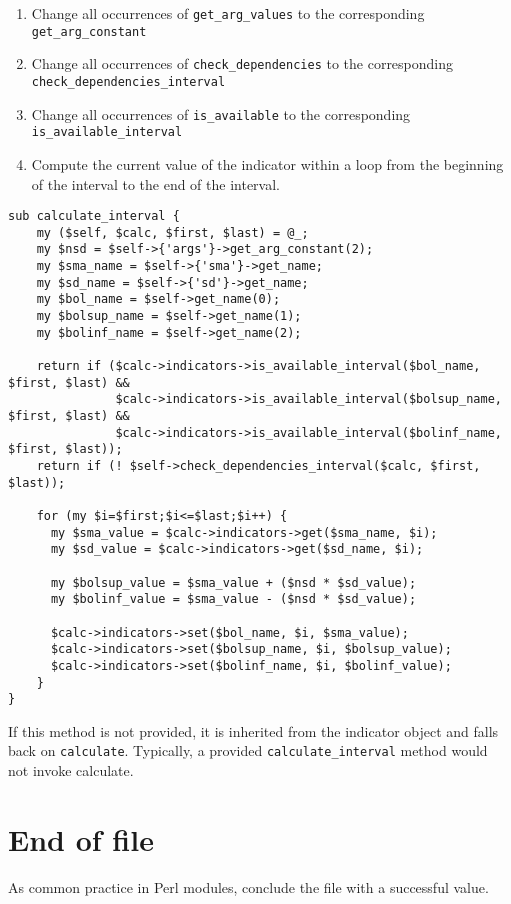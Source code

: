 \documentclass[11pt,twoside]{article}
\begin{document}
\begin{enumerate}
\item Change all occurrences of \lstinline!get_arg_values! to the
corresponding \lstinline!get_arg_constant!
\item Change all occurrences of \lstinline!check_dependencies! to
the corresponding \lstinline!check_dependencies_interval!
\item Change all occurrences of \lstinline!is_available! to the
corresponding \lstinline!is_available_interval!
\item Compute the current value of the indicator within a loop from the
beginning of the interval to the end of the interval.
\end{enumerate}

\begin{lstlisting}[name=example]
sub calculate_interval {
    my ($self, $calc, $first, $last) = @_;
    my $nsd = $self->{'args'}->get_arg_constant(2);
    my $sma_name = $self->{'sma'}->get_name;
    my $sd_name = $self->{'sd'}->get_name;
    my $bol_name = $self->get_name(0);
    my $bolsup_name = $self->get_name(1);
    my $bolinf_name = $self->get_name(2);

    return if ($calc->indicators->is_available_interval($bol_name, $first, $last) &&
               $calc->indicators->is_available_interval($bolsup_name, $first, $last) &&
               $calc->indicators->is_available_interval($bolinf_name, $first, $last));
    return if (! $self->check_dependencies_interval($calc, $first, $last));

    for (my $i=$first;$i<=$last;$i++) {
      my $sma_value = $calc->indicators->get($sma_name, $i);
      my $sd_value = $calc->indicators->get($sd_name, $i);

      my $bolsup_value = $sma_value + ($nsd * $sd_value);
      my $bolinf_value = $sma_value - ($nsd * $sd_value);

      $calc->indicators->set($bol_name, $i, $sma_value);
      $calc->indicators->set($bolsup_name, $i, $bolsup_value);
      $calc->indicators->set($bolinf_name, $i, $bolinf_value);
    }
}
\end{lstlisting}
If this method is not provided, it is inherited from the indicator object and
falls back on \lstinline!calculate!. Typically, a provided \lstinline!calculate_interval! method would not invoke calculate.

\section{End of file}
As common practice in Perl modules, conclude the file with a successful
value.
\end{document}

